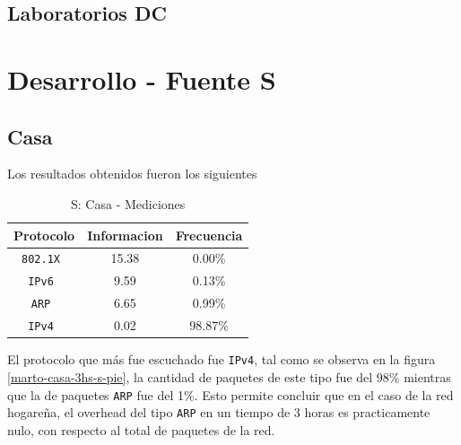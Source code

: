 \documentclass[final,inline,a4paper,narroweqnarray]{ieee}
\begin{document}
\subsection{Laboratorios DC}



\section{Desarrollo - Fuente S}
  \subsection{Casa}

   Los resultados obtenidos fueron los siguientes

\begin{table}[h]\begin{center}
    \begin{tabular}{|c|c|c|}
    \hline
    \textbf{Protocolo} & \textbf{Informacion} & \textbf{Frecuencia} \\ \hline
    \texttt{802.1X    }& 15.38       & 0.00\%     \\ \hline
    \texttt{IPv6      }& 9.59        & 0.13\%     \\ \hline
    \texttt{ARP       }& 6.65        & 0.99\%     \\ \hline
    \texttt{IPv4      }& 0.02        & 98.87\%    \\ \hline
    \end{tabular} 
    \caption{S: Casa - Mediciones}
    \label{casa-s-table}
\end{center}\end{table}

    El protocolo que más fue escuchado fue \texttt{IPv4}, tal como se
    observa en la figura \ref{marto-casa-3hs-s-pie}, la cantidad de
    paquetes  de este tipo fue del 98\% mientras que la de paquetes
    \texttt{ARP} fue del 1\%. Esto permite concluir que en el caso de
    la red hogareña, el overhead del tipo \texttt{ARP} en un tiempo de
    3 horas es practicamente nulo, con respecto al total de paquetes
    de la red.

\end{document}
